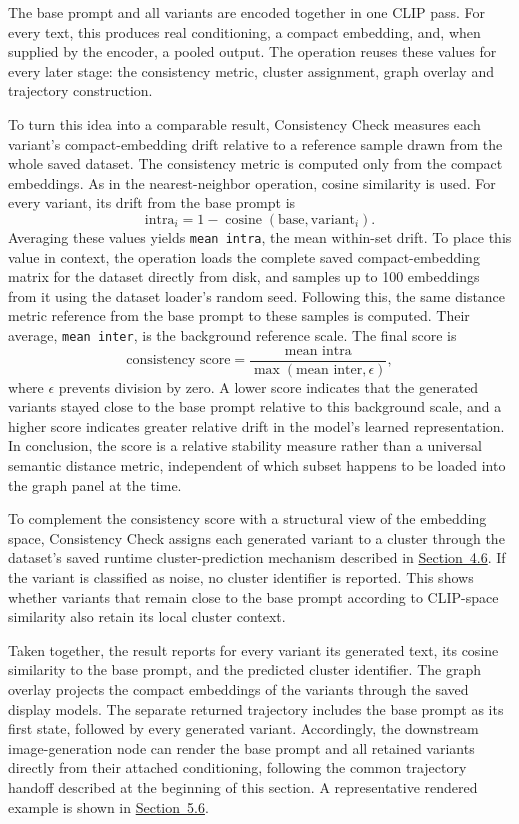 The base prompt and all variants are encoded together in one CLIP pass. For every text, this produces real conditioning, a compact embedding, and, when supplied by the encoder, a pooled output. The operation reuses these values for every later stage: the consistency metric, cluster assignment, graph overlay and trajectory construction.

To turn this idea into a comparable result, Consistency Check measures each variant's compact-embedding drift relative to a reference sample drawn from the whole saved dataset. The consistency metric is computed only from the compact embeddings. As in the nearest-neighbor operation, cosine similarity is used. For every variant, its drift from the base prompt is
\[
\mathrm{intra}_i = 1 - \operatorname{cosine}(\mathrm{base}, \mathrm{variant}_i).
\]
Averaging these values yields \texttt{mean intra}, the mean within-set drift. To place this value in context, the operation loads the complete saved compact-embedding matrix for the dataset directly from disk, and samples up to 100 embeddings from it using the dataset loader's random seed. Following this, the same distance metric reference from the base prompt to these samples is computed. Their average, \texttt{mean inter}, is the background reference scale. The final score is
\[
\text{consistency score} = \frac{\text{mean intra}}{\max(\text{mean inter}, \epsilon)},
\]
where $\epsilon$ prevents division by zero. A lower score indicates that the generated variants stayed close to the base prompt relative to this background scale, and a higher score indicates greater relative drift in the model's learned representation. In conclusion, the score is a relative stability measure rather than a universal semantic distance metric, independent of which subset happens to be loaded into the graph panel at the time.

To complement the consistency score with a structural view of the embedding space, Consistency Check assigns each generated variant to a cluster through the dataset's saved runtime cluster-prediction mechanism described in \hyperref[sec:4.6]{Section~4.6}. If the variant is classified as noise, no cluster identifier is reported. This shows whether variants that remain close to the base prompt according to CLIP-space similarity also retain its local cluster context.

Taken together, the result reports for every variant its generated text, its cosine similarity to the base prompt, and the predicted cluster identifier. The graph overlay projects the compact embeddings of the variants through the saved display models. The separate returned trajectory includes the base prompt as its first state, followed by every generated variant. Accordingly, the downstream image-generation node can render the base prompt and all retained variants directly from their attached conditioning, following the common trajectory handoff described at the beginning of this section. A representative rendered example is shown in \hyperref[sec:5.6]{Section~5.6}.

